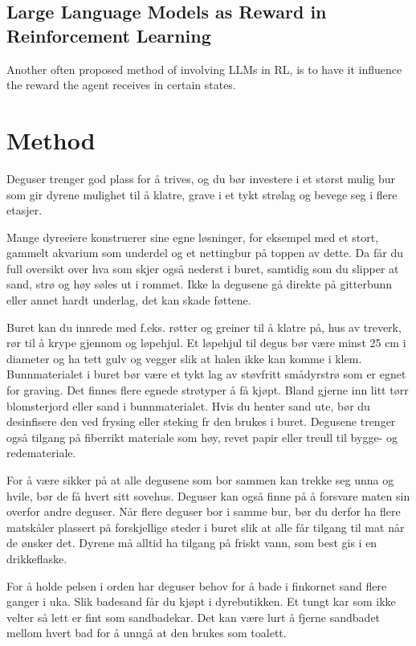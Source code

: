 \documentclass[conference]{IEEEtran}
\begin{document}
\subsection{Large Language Models as Reward in Reinforcement Learning}

Another often proposed method of involving LLMs in RL, is to have it influence the reward the agent receives in certain states. \cite{ellm} 

\section{Method}

Deguser trenger god plass for å trives, og du bør investere i et størst mulig bur som gir dyrene mulighet til å klatre, grave i et tykt strølag og bevege seg i flere etasjer.

Mange dyreeiere konstruerer sine egne løsninger, for eksempel med et stort, gammelt akvarium som underdel og et nettingbur på toppen av dette. Da får du full oversikt over hva som skjer også nederst i buret, samtidig som du slipper at sand, strø og høy søles ut i rommet. Ikke la degusene gå direkte på gitterbunn eller annet hardt underlag, det kan skade føttene.

Buret kan du innrede med f.eks. røtter og greiner til å klatre på, hus av treverk, rør til å krype gjennom og løpehjul. Et løpehjul til degus bør være minst 25 cm i diameter og ha tett gulv og vegger slik at halen ikke kan komme i klem. Bunnmaterialet i buret bør være et tykt lag av støvfritt smådyrstrø som er egnet for graving. Det finnes flere egnede strøtyper å få kjøpt. Bland gjerne inn litt tørr blomsterjord eller sand i bunnmaterialet. Hvis du henter sand ute, bør du desinfisere den ved frysing eller steking fr den brukes i buret. Degusene trenger også tilgang på fiberrikt materiale som høy, revet papir eller treull til bygge- og redemateriale.

For å være sikker på at alle degusene som bor sammen kan trekke seg unna og hvile, bør de få hvert sitt sovehus. Deguser kan også finne på å forsvare maten sin overfor andre deguser. Når flere deguser bor i samme bur, bør du derfor ha flere matskåler plassert på forskjellige steder i buret slik at alle får tilgang til mat når de ønsker det. Dyrene må alltid ha tilgang på friskt vann, som best gis i en drikkeflaske.

For å holde pelsen i orden har deguser behov for å bade i finkornet sand flere ganger i uka. Slik badesand får du kjøpt i dyrebutikken. Et tungt kar som ikke velter så lett er fint som sandbadekar. Det kan være lurt å fjerne sandbadet mellom hvert bad for å unngå at den brukes som toalett.
\end{document}
